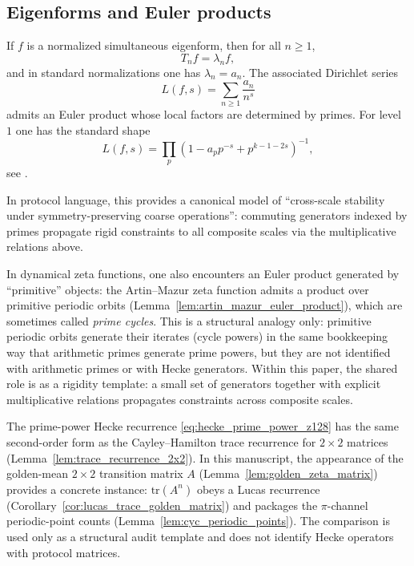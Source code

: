 \subsection{Eigenforms and Euler products}
\label{subsec:hecke_eigenforms_euler_product}

If $f$ is a normalized simultaneous eigenform, then for all $n\ge 1$,
\[
T_n f = \lambda_n f,
\]
and in standard normalizations one has $\lambda_n=a_n$.
The associated Dirichlet series
\[
L(f,s)=\sum_{n\ge 1}\frac{a_n}{n^s}
\]
admits an Euler product whose local factors are determined by primes. For level $1$ one has the standard shape
\begin{equation}
\label{eq:euler_product_level1_z128}
L(f,s)=\prod_{p}\left(1-a_p p^{-s}+p^{k-1-2s}\right)^{-1},
\end{equation}
see \cite{Apostol1990,DiamondShurman2005}.

\AuditTag In protocol language, this provides a canonical model of ``cross-scale stability under symmetry-preserving coarse operations'': commuting generators indexed by primes propagate rigid constraints to all composite scales via the multiplicative relations above.

\begin{remark}\label{rem:prime_cycles_structural_analogy}
\AuditTag In dynamical zeta functions, one also encounters an Euler product generated by ``primitive'' objects:
the Artin--Mazur zeta function admits a product over primitive periodic orbits (Lemma~\ref{lem:artin_mazur_euler_product}), which are sometimes called \emph{prime cycles}.
This is a structural analogy only: primitive periodic orbits generate their iterates (cycle powers) in the same bookkeeping way that arithmetic primes generate prime powers, but they are not identified with arithmetic primes or with Hecke generators.
Within this paper, the shared role is as a rigidity template: a small set of generators together with explicit multiplicative relations propagates constraints across composite scales.
\end{remark}

\begin{remark}\label{rem:hecke_trace_recurrence_skeleton}
\AuditTag The prime-power Hecke recurrence \eqref{eq:hecke_prime_power_z128} has the same second-order form as the Cayley--Hamilton trace recurrence for $2\times 2$ matrices (Lemma~\ref{lem:trace_recurrence_2x2}).
In this manuscript, the appearance of the golden-mean $2\times 2$ transition matrix $A$ (Lemma~\ref{lem:golden_zeta_matrix}) provides a concrete instance: $\mathrm{tr}(A^n)$ obeys a Lucas recurrence (Corollary~\ref{cor:lucas_trace_golden_matrix}) and packages the $\pi$-channel periodic-point counts (Lemma~\ref{lem:cyc_periodic_points}).
The comparison is used only as a structural audit template and does not identify Hecke operators with protocol matrices.
\end{remark}

